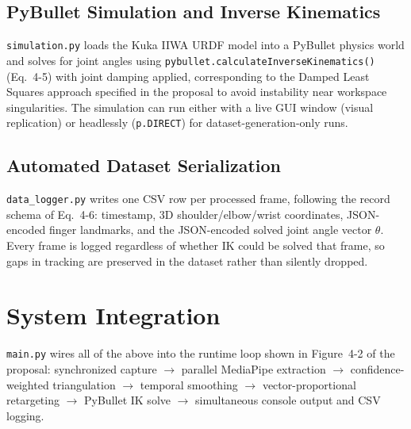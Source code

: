 \subsection{PyBullet Simulation and Inverse Kinematics}

\texttt{simulation.py} loads the Kuka IIWA URDF model into a PyBullet
physics world and solves for joint angles using
\texttt{pybullet.calculateInverseKinematics()} (Eq.~4-5) with joint
damping applied, corresponding to the Damped Least Squares approach
specified in the proposal to avoid instability near workspace
singularities. The simulation can run either with a live GUI window
(visual replication) or headlessly (\texttt{p.DIRECT}) for
dataset-generation-only runs.

\subsection{Automated Dataset Serialization}

\texttt{data\_logger.py} writes one CSV row per processed frame, following
the record schema of Eq.~4-6: timestamp, 3D shoulder/elbow/wrist
coordinates, JSON-encoded finger landmarks, and the JSON-encoded solved
joint angle vector $\theta$. Every frame is logged regardless of whether
IK could be solved that frame, so gaps in tracking are preserved in the
dataset rather than silently dropped.

\section{System Integration}

\texttt{main.py} wires all of the above into the runtime loop shown in
Figure~4-2 of the proposal: synchronized capture $\rightarrow$ parallel
MediaPipe extraction $\rightarrow$ confidence-weighted triangulation
$\rightarrow$ temporal smoothing $\rightarrow$ vector-proportional
retargeting $\rightarrow$ PyBullet IK solve $\rightarrow$ simultaneous
console output and CSV logging.
